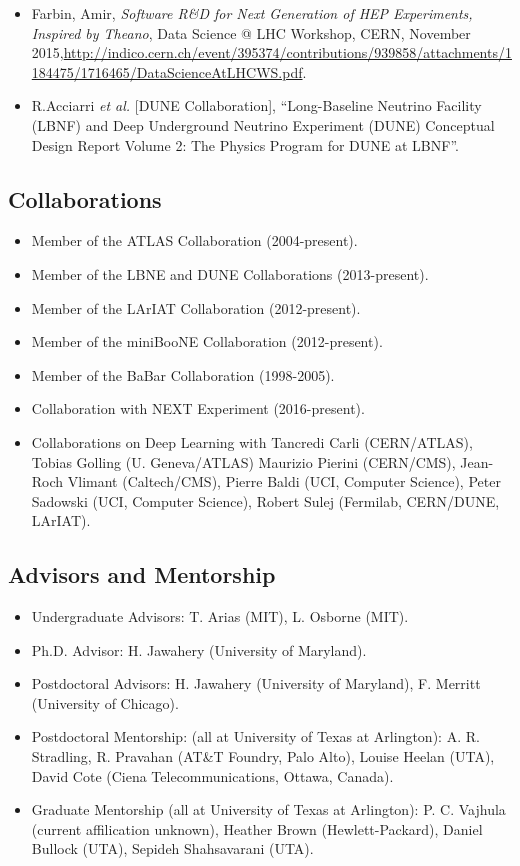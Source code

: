 \begin{itemize}
\item Farbin, Amir, \emph{Software R\&D for Next Generation of HEP Experiments, Inspired by Theano},
     Data Science @ LHC Workshop, CERN, November 2015,\url {http://indico.cern.ch/event/395374/contributions/939858/attachments/1184475/1716465/DataScienceAtLHCWS.pdf}.

\item
 R.Acciarri {\it et al.} [DUNE Collaboration], ``Long-Baseline
 Neutrino Facility (LBNF) and Deep Underground Neutrino Experiment
 (DUNE) Conceptual Design Report Volume 2: The Physics Program for
 DUNE at LBNF''. 

\end{itemize}
\subsection*{Collaborations}
\begin{itemize}
\item Member of the ATLAS Collaboration (2004-present). 
\item Member of the LBNE and DUNE Collaborations (2013-present). 
\item Member of the LArIAT Collaboration (2012-present). 
\item Member of the miniBooNE Collaboration (2012-present). 
\item Member of the BaBar Collaboration (1998-2005). 
\item Collaboration with NEXT Experiment (2016-present). 
\item Collaborations on Deep Learning with Tancredi Carli (CERN/ATLAS), Tobias Golling (U. Geneva/ATLAS) Maurizio Pierini (CERN/CMS), Jean-Roch Vlimant (Caltech/CMS), Pierre Baldi (UCI, Computer Science), Peter Sadowski (UCI, Computer Science), Robert Sulej (Fermilab, CERN/DUNE, LArIAT).
\end{itemize}

\subsection*{Advisors and Mentorship}
\begin{itemize}
\item Undergraduate Advisors: T. Arias (MIT), L. Osborne (MIT).
\item Ph.D. Advisor: H. Jawahery (University of Maryland).
\item Postdoctoral Advisors:  H. Jawahery (University of Maryland), F. Merritt (University of Chicago).
\item Postdoctoral Mentorship:  (all at University of Texas at Arlington): A. R. Stradling, R. Pravahan (AT\&T Foundry, Palo Alto), Louise Heelan (UTA), David Cote (Ciena Telecommunications, Ottawa, Canada).
\item Graduate Mentorship (all at University of Texas at Arlington): P. C. Vajhula (current affilication unknown), Heather Brown (Hewlett-Packard),  Daniel Bullock (UTA),  Sepideh Shahsavarani (UTA).
\end{itemize}

%
